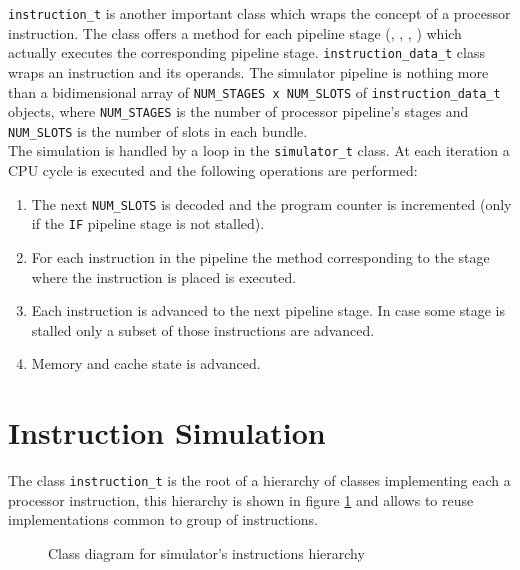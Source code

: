 \texttt{instruction\_t} is another important class which wraps the concept of a processor instruction. The class offers a method for each pipeline stage (\IF, \DR, \EX, \MW) which actually executes the corresponding pipeline stage. \texttt{instruction\_data\_t} class wraps an instruction and its operands. The simulator pipeline is nothing more than a bidimensional array of \texttt{NUM\_STAGES x NUM\_SLOTS} of \texttt{instruction\allowbreak\_data\_t} objects, where \texttt{NUM\_STAGES} is the number of processor pipeline's stages and \texttt{NUM\_SLOTS} is the number of slots in each bundle.\\

The simulation is handled by a loop in the \texttt{simulator\_t} class. At each iteration a CPU cycle is executed and the following operations are performed:

\begin{enumerate}
	\item The next \texttt{NUM\_SLOTS} is decoded and the program counter is incremented (only if the \texttt{IF} pipeline stage is not stalled).
	\item For each instruction in the pipeline the method corresponding to the stage where the instruction is placed is executed.
	\item Each instruction is advanced to the next pipeline stage. In case some stage is stalled only a subset of those instructions are advanced.
	\item Memory and cache state is advanced.
\end{enumerate}

\section{Instruction Simulation}

The class \texttt{instruction\_t} is the root of a hierarchy of classes implementing each a processor instruction, this hierarchy is shown in figure \ref{instruction_hierarchy} and allows to reuse implementations common to group of instructions.

	\begin{figure}[!ht]
		\begin{center}
		\end{center}
		\caption{Class diagram for simulator's instructions hierarchy}
		\label{instruction_hierarchy}
	\end{figure}

